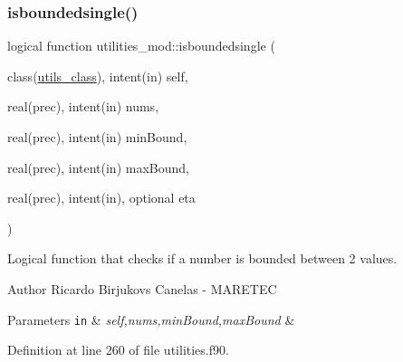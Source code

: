 \subsubsection{\texorpdfstring{isboundedsingle()}{isboundedsingle()}}
{\footnotesize\ttfamily logical function utilities\+\_\+mod\+::isboundedsingle (\begin{DoxyParamCaption}\item[{class(\mbox{\hyperlink{structutilities__mod_1_1utils__class}{utils\+\_\+class}}), intent(in)}]{self,  }\item[{real(prec), intent(in)}]{nums,  }\item[{real(prec), intent(in)}]{min\+Bound,  }\item[{real(prec), intent(in)}]{max\+Bound,  }\item[{real(prec), intent(in), optional}]{eta }\end{DoxyParamCaption})\hspace{0.3cm}{\ttfamily [private]}}



Logical function that checks if a number is bounded between 2 values. 

\begin{DoxyAuthor}{Author}
Ricardo Birjukovs Canelas -\/ M\+A\+R\+E\+T\+EC 
\end{DoxyAuthor}

\begin{DoxyParams}[1]{Parameters}
\mbox{\tt in}  & {\em self,nums,min\+Bound,max\+Bound} & \\
\hline
\end{DoxyParams}


Definition at line 260 of file utilities.\+f90.



